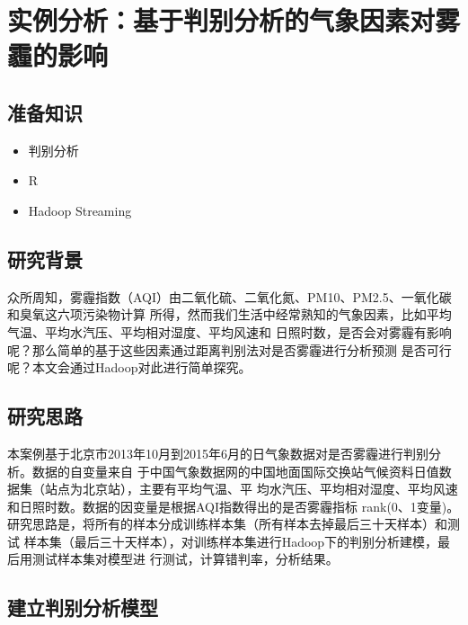 \section{实例分析：基于判别分析的气象因素对雾霾的影响}\label{ux5b9eux4f8bux5206ux6790ux57faux4e8eux5224ux522bux5206ux6790ux7684ux6c14ux8c61ux56e0ux7d20ux5bf9ux96feux973eux7684ux5f71ux54cd}

\subsection{准备知识}\label{ux51c6ux5907ux77e5ux8bc6}

\begin{itemize}
\itemsep1pt\parskip0pt
\item
  判别分析
\item
  R
\item
  Hadoop Streaming
\end{itemize}

\subsection{研究背景}\label{ux7814ux7a76ux80ccux666f}

众所周知，雾霾指数（AQI）由二氧化硫、二氧化氮、PM10、PM2.5、一氧化碳和臭氧这六项污染物计算
所得，然而我们生活中经常熟知的气象因素，比如平均气温、平均水汽压、平均相对湿度、平均风速和
日照时数，是否会对雾霾有影响呢？那么简单的基于这些因素通过距离判别法对是否雾霾进行分析预测
是否可行呢？本文会通过Hadoop对此进行简单探究。

\subsection{研究思路}\label{ux7814ux7a76ux601dux8def}

本案例基于北京市2013年10月到2015年6月的日气象数据对是否雾霾进行判别分析。数据的自变量来自
于中国气象数据网的中国地面国际交换站气候资料日值数据集（站点为北京站），主要有平均气温、平
均水汽压、平均相对湿度、平均风速和日照时数。数据的因变量是根据AQI指数得出的是否雾霾指标
rank(0、1变量)。研究思路是，将所有的样本分成训练样本集（所有样本去掉最后三十天样本）和测试
样本集（最后三十天样本），对训练样本集进行Hadoop下的判别分析建模，最后用测试样本集对模型进
行测试，计算错判率，分析结果。

\subsection{建立判别分析模型}\label{ux5efaux7acbux5224ux522bux5206ux6790ux6a21ux578b}


